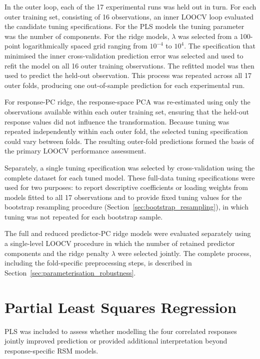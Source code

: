 \documentclass[MScDSA]{uccthesis}
\begin{document}
In the outer loop, each of the 17 experimental runs was held out in turn. For each outer training set, consisting of 16 observations, an inner LOOCV loop evaluated the candidate tuning specifications. For the PLS models the tuning parameter was the number of components. For the ridge models, $\lambda$ was selected from a 100-point logarithmically spaced grid ranging from $10^{-4}$ to  $10^4$. The specification that minimised the inner cross-validation prediction error was selected and used to refit the model on all 16 outer training observations. The refitted model was then used to predict the held-out observation. This process was repeated across all 17 outer folds, producing one out-of-sample prediction for each experimental run.

For response-PC ridge, the response-space PCA was re-estimated using only the observations available within each outer training set, ensuring that the held-out response values did not influence the transformation. Because tuning was repeated independently within each outer fold, the selected tuning specification could vary between folds. The resulting outer-fold predictions formed the basis of the primary LOOCV performance assessment.

Separately, a single tuning specification was selected by cross-validation using the complete dataset for each tuned model. These full-data tuning specifications were used for two purposes: to report descriptive coefficients or loading weights from models fitted to all 17 observations and to provide fixed tuning values for the bootstrap resampling procedure (Section~\ref{sec:bootstrap_resampling}), in which tuning was not repeated for each bootstrap sample.

The full and reduced predictor-PC ridge models were evaluated separately using a single-level LOOCV procedure in which the number of retained predictor components and the ridge penalty $\lambda$ were selected jointly. The complete process, including the fold-specific preprocessing steps, is described in Section~\ref{sec:parameterisation_robustness}.

\section{Partial Least Squares Regression}
\label{sec:pls_regression}
PLS was included to assess whether modelling the four correlated responses jointly improved prediction or provided additional interpretation beyond response-specific RSM models.
\end{document}
